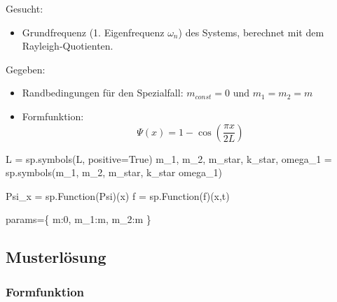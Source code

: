 \documentclass[
  letterpaper,
  DIV=11,
  numbers=noendperiod]{scrartcl}
\newenvironment{Shaded}{\begin{snugshade}}{\end{snugshade}}
\newcommand{\DecValTok}[1]{\textcolor[rgb]{0.68,0.00,0.00}{#1}}
\newcommand{\NormalTok}[1]{\textcolor[rgb]{0.00,0.23,0.31}{#1}}
\newcommand{\OperatorTok}[1]{\textcolor[rgb]{0.37,0.37,0.37}{#1}}
\newcommand{\StringTok}[1]{\textcolor[rgb]{0.13,0.47,0.30}{#1}}
\newcommand{\VariableTok}[1]{\textcolor[rgb]{0.07,0.07,0.07}{#1}}
\providecommand{\tightlist}{%
  \setlength{\itemsep}{0pt}\setlength{\parskip}{0pt}}\usepackage{longtable,booktabs,array}
\begin{document}
Gesucht:

\begin{itemize}
\tightlist
\item
  Grundfrequenz (1. Eigenfrequenz \(\omega_n\)) des Systems, berechnet
  mit dem Rayleigh-Quotienten.
\end{itemize}

Gegeben:

\begin{itemize}
\tightlist
\item
  Randbedingungen für den Spezialfall:
  \(m_{const} = 0 \text{ und } m_1 = m_2 = m\)
\item
  Formfunktion: \[ \Psi(x) = 1 - \cos(\frac{\pi x}{2L})\]
\end{itemize}

\begin{Shaded}
\begin{Highlighting}[]
\NormalTok{L }\OperatorTok{=}\NormalTok{ sp.symbols(}\StringTok{\textquotesingle{}L\textquotesingle{}}\NormalTok{, positive}\OperatorTok{=}\VariableTok{True}\NormalTok{)}
\NormalTok{m\_1, m\_2, m\_star, k\_star, omega\_1 }\OperatorTok{=}\NormalTok{ sp.symbols(}\StringTok{\textquotesingle{}m\_1, m\_2, m\_star, k\_star omega\_1\textquotesingle{}}\NormalTok{)}

\NormalTok{Psi\_x }\OperatorTok{=}\NormalTok{ sp.Function(}\StringTok{\textquotesingle{}Psi\textquotesingle{}}\NormalTok{)(x)}
\NormalTok{f }\OperatorTok{=}\NormalTok{ sp.Function(}\StringTok{\textquotesingle{}f\textquotesingle{}}\NormalTok{)(x,t)}
\end{Highlighting}
\end{Shaded}

\begin{Shaded}
\begin{Highlighting}[]
\NormalTok{params}\OperatorTok{=}\NormalTok{\{}
\NormalTok{    m:}\DecValTok{0}\NormalTok{,}
\NormalTok{    m\_1:m,}
\NormalTok{    m\_2:m}
\NormalTok{\}}
\end{Highlighting}
\end{Shaded}

\newpage{}

\hypertarget{musterluxf6sung}{%
\subsection{Musterlösung}\label{musterluxf6sung}}

\hypertarget{formfunktion}{%
\subsubsection{Formfunktion}\label{formfunktion}}
\end{document}
